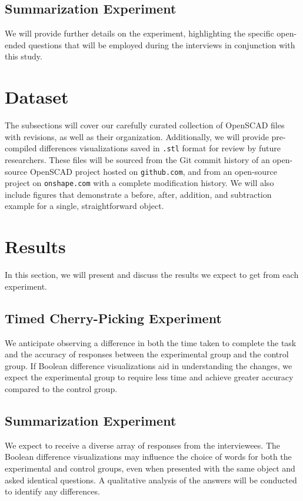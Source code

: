 \documentclass[sigconf,authorversion,nonacm]{acmart}
\begin{document}
\subsection{Summarization Experiment}

We will provide further details on the experiment, highlighting the specific open-ended questions that will be employed during the interviews in conjunction with this study.

\section{Dataset}

The subsections will cover our carefully curated collection of OpenSCAD files with revisions, as well as their organization. Additionally, we will provide pre-compiled differences visualizations saved in \texttt{.stl} format for review by future researchers. These files will be sourced from the Git commit history of an open-source OpenSCAD project hosted on \texttt{github.com}, and from an open-source project on \texttt{onshape.com} with a complete modification history.
We will also include figures that demonstrate a before, after, addition, and subtraction example for a single, straightforward object.

\section{Results}

In this section, we will present and discuss the results we expect to get from each experiment.
\subsection{Timed Cherry-Picking Experiment}
We anticipate observing a difference in both the time taken to complete the task and the accuracy of responses between the experimental group and the control group. If Boolean difference visualizations aid in understanding the changes, we expect the experimental group to require less time and achieve greater accuracy compared to the control group.

\subsection{Summarization Experiment}
We expect to receive a diverse array of responses from the interviewees. The Boolean difference visualizations may influence the choice of words for both the experimental and control groups, even when presented with the same object and asked identical questions. A qualitative analysis of the answers will be conducted to identify any differences.
\end{document}
